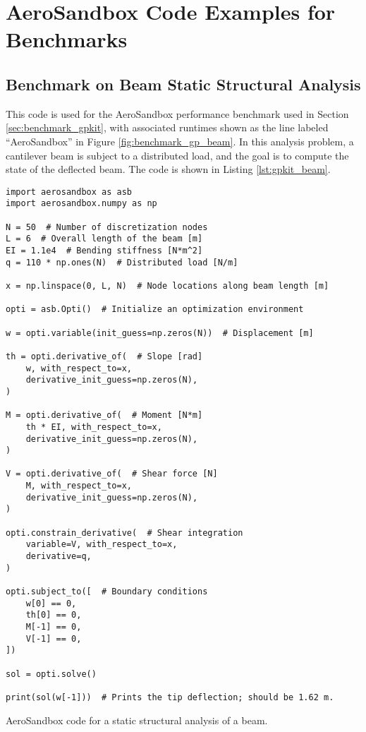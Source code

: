 \chapter{AeroSandbox Code Examples for Benchmarks}
\label{chap:code}


\section{Benchmark on Beam Static Structural Analysis}

This code is used for the AeroSandbox performance benchmark used in Section \ref{sec:benchmark_gpkit}, with associated runtimes shown as the line labeled ``AeroSandbox'' in Figure \ref{fig:benchmark_gp_beam}. In this analysis problem, a cantilever beam is subject to a distributed load, and the goal is to compute the state of the deflected beam. The code is shown in Listing \ref{lst:gpkit_beam}.

\begin{listing}[h]
    \begin{verbatim}
import aerosandbox as asb
import aerosandbox.numpy as np

N = 50  # Number of discretization nodes
L = 6  # Overall length of the beam [m]
EI = 1.1e4  # Bending stiffness [N*m^2]
q = 110 * np.ones(N)  # Distributed load [N/m]

x = np.linspace(0, L, N)  # Node locations along beam length [m]

opti = asb.Opti()  # Initialize an optimization environment

w = opti.variable(init_guess=np.zeros(N))  # Displacement [m]

th = opti.derivative_of(  # Slope [rad]
    w, with_respect_to=x,
    derivative_init_guess=np.zeros(N),
)

M = opti.derivative_of(  # Moment [N*m]
    th * EI, with_respect_to=x,
    derivative_init_guess=np.zeros(N),
)

V = opti.derivative_of(  # Shear force [N]
    M, with_respect_to=x,
    derivative_init_guess=np.zeros(N),
)

opti.constrain_derivative(  # Shear integration
    variable=V, with_respect_to=x,
    derivative=q,
)

opti.subject_to([  # Boundary conditions
    w[0] == 0,
    th[0] == 0,
    M[-1] == 0,
    V[-1] == 0,
])

sol = opti.solve()

print(sol(w[-1]))  # Prints the tip deflection; should be 1.62 m.
    \end{verbatim}
    \caption{AeroSandbox code for a static structural analysis of a beam.}
    \label{lst:gpkit_beam}
\end{listing}

